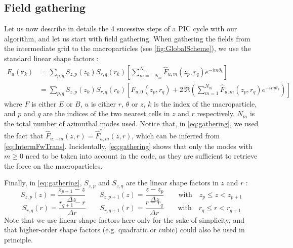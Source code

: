 \documentclass[1p,times,authoryear]{elsarticle}
\renewcommand{\vec}[1]{\boldsymbol{#1}}
\begin{document}
\subsection{Field gathering}
\label{sec:gathering}

Let us now describe in details the 4 sucessive steps of a PIC cycle
with our algorithm, and let us start with field gathering.
When gathering the fields from the intermediate grid to the
macroparticles (see \cref{fig:GlobalScheme}),
we use the standard linear shape factors :
\begin{align} 
F_u(\vec{r}_k) &=  \sum_{p,q} S_{z,p}(z_k)S_{r,q}(r_k) \left[ \sum_{m=-N_m}^{N_m} \hat{F}_{u,m}(z_p, r_q)
  e^{-im\theta_k} \right] \\
& = \sum_{p,q} S_{z,p}(z_k)S_{r,q}(r_k) \left[ \hat{F}_{u,0}(z_p,
  r_q) + 2\,\Re \left( \sum_{m=1}^{N_m} \hat{F}_{u,m}(z_p, r_q)
  e^{-im\theta_k} \right) \right] \label{eq:gathering}
\end{align}
where $F$ is either $E$ or $B$, $u$ is either $r$, $\theta$ or $z$, $k$ is the index of the macroparticle,
and $p$ and $q$ are the indices of the two nearest cells in $z$ and
$r$ respectively. $N_m$ is the total number
of azimuthal modes used. Notice that, in \cref{eq:gathering}, we used the fact that
$\hat{F}_{u,-m}(z,r) = \hat{F}^*_{u,m}(z,r) $, which can be
inferred from \cref{eq:IntermFwTrans}. Incidentally, \cref{eq:gathering} shows that only the modes
with $m\geq 0$ need to be taken into account in the code, as they are 
sufficient to retrieve the force on the macroparticles.

Finally, in \cref{eq:gathering}, $S_{z,p}$ and $S_{z,q}$ are the linear
shape factors in $z$ and $r$ :
\[ S_{z,p}(z) = \frac{z_{p+1}- z}{\Delta z}  \qquad 
S_{z,p +1}(z) = \frac{ z - z_{p} }{\Delta z} \qquad
\mathrm{with} \quad z_{p} \leq z < z_{p +1}  \]
\[ S_{r,q}(r) = \frac{ r_{q+1} - r }{  \Delta r }
\qquad S_{r,q+1}(r) = \frac{ r - r_{q} }{  \Delta r }
\qquad \mathrm{with} \quad r_{q} \leq r < r_{q+1}
 \]
\noindent Note that we use linear shape factors here only for
the sake of simplicity, and that higher-order shape factors
(e.g. quadratic or cubic) could also be used in principle.
 
\end{document}
